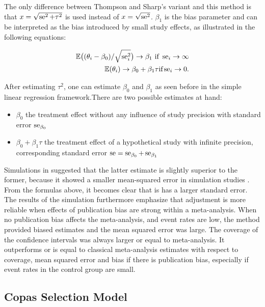 \documentclass[11pt,a4paper,twoside]{book}\usepackage[]{graphicx}\usepackage[]{color}
\begin{document}
The only difference between Thompson and Sharp's variant and this method is that $x = \sqrt{\operatorname{se}^2 + \tau^2}$ is used instead of $x = \sqrt{\operatorname{se}^2}$. $\beta_{1}$ is the bias parameter and can be interpreted as the bias introduced by small study effects, as illustrated in the following equations:

\begin{align}
\mathbb{E}\big((\theta_i - \beta_0)/\sqrt{\se_i^2}\big) \rightarrow \beta_1 \textrm{ if } \se_i \rightarrow \infty \nonumber \\ %
\mathbb{E}(\theta_i) \rightarrow \beta_0 + \beta_1 \tau \textrm{if} \se_i \rightarrow 0. \nonumber
\end{align}

After estimating $\tau^2$, one can estimate $\beta_{0}$ and $\beta_{1}$ as seen before in the simple linear regression framework.There are two possible estimates at hand:
\begin{itemize}
\item $\beta_0$ the treatment effect without any influence of study precision with standard error $\operatorname{se}_{\beta_0}$
\item $\beta_0 + \beta_1 \tau$ the treatment effect of a hypothetical study with infinite precision, corresponding standard error $\operatorname{se} = \operatorname{se}_{\beta_0} + \operatorname{se}_{\beta_1}$
\end{itemize}

Simulations in \citet{limitmeta} suggested that the latter estimate is slightly superior to the former, because it showed a smaller mean-squared error in simulation studies \citet{limitmeta.2}. From the formulas above, it becomes clear that is has a larger standard error. The results of the simulation furthermore emphasize that adjustment is more reliable when effects of publication bias are strong within a meta-analysis. When no publication bias affects the meta-analysis, and event rates are low, the method provided biased estimates and the mean squared error was large. The coverage of the confidence intervals was always larger or equal to meta-analysis. It outperforms or is equal to classical meta-analysis estimates with respect to coverage, mean squared error and bias if there is publication bias, especially if event rates in the control group are small. 



\subsection{Copas Selection Model} \label{sec:copas}
\end{document}
